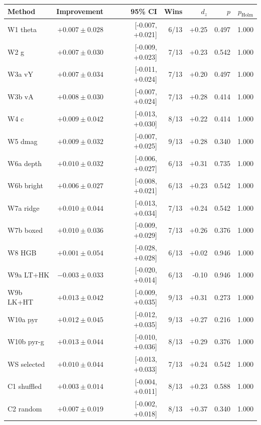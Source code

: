 \begin{tabular}{lrrrrrr}
\toprule
Method & Improvement & 95\% CI & Wins & $d_z$ & $p$ & $p_{\mathrm{Holm}}$ \\
\midrule
W1 theta & $+0.007 \pm 0.028$ & [-0.007, +0.021] & 6/13 & +0.25 & 0.497 & 1.000 \\
W2 g & $+0.007 \pm 0.030$ & [-0.009, +0.023] & 7/13 & +0.23 & 0.542 & 1.000 \\
W3a vY & $+0.007 \pm 0.034$ & [-0.011, +0.024] & 7/13 & +0.20 & 0.497 & 1.000 \\
W3b vA & $+0.008 \pm 0.030$ & [-0.007, +0.024] & 7/13 & +0.28 & 0.414 & 1.000 \\
W4 c & $+0.009 \pm 0.042$ & [-0.013, +0.030] & 8/13 & +0.22 & 0.414 & 1.000 \\
W5 dmag & $+0.009 \pm 0.032$ & [-0.007, +0.025] & 9/13 & +0.28 & 0.340 & 1.000 \\
W6a depth & $+0.010 \pm 0.032$ & [-0.006, +0.027] & 6/13 & +0.31 & 0.735 & 1.000 \\
W6b bright & $+0.006 \pm 0.027$ & [-0.008, +0.021] & 6/13 & +0.23 & 0.542 & 1.000 \\
W7a ridge & $+0.010 \pm 0.044$ & [-0.013, +0.034] & 7/13 & +0.24 & 0.542 & 1.000 \\
W7b boxed & $+0.010 \pm 0.036$ & [-0.009, +0.029] & 7/13 & +0.26 & 0.376 & 1.000 \\
W8 HGB & $+0.001 \pm 0.054$ & [-0.028, +0.028] & 6/13 & +0.02 & 0.946 & 1.000 \\
W9a LT+HK & $-0.003 \pm 0.033$ & [-0.020, +0.014] & 6/13 & -0.10 & 0.946 & 1.000 \\
W9b LK+HT & $+0.013 \pm 0.042$ & [-0.009, +0.035] & 9/13 & +0.31 & 0.273 & 1.000 \\
W10a pyr & $+0.012 \pm 0.045$ & [-0.012, +0.035] & 9/13 & +0.27 & 0.216 & 1.000 \\
W10b pyr-g & $+0.013 \pm 0.044$ & [-0.010, +0.036] & 8/13 & +0.29 & 0.376 & 1.000 \\
WS selected & $+0.010 \pm 0.044$ & [-0.013, +0.033] & 7/13 & +0.24 & 0.542 & 1.000 \\
C1 shuffled & $+0.003 \pm 0.014$ & [-0.004, +0.011] & 8/13 & +0.23 & 0.588 & 1.000 \\
C2 random & $+0.007 \pm 0.019$ & [-0.002, +0.018] & 8/13 & +0.37 & 0.340 & 1.000 \\
\bottomrule
\end{tabular}

